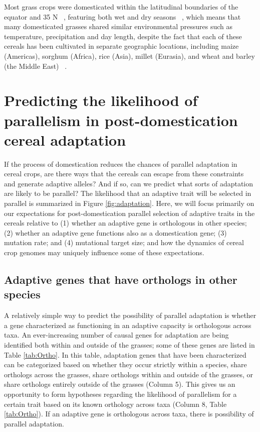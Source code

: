 \documentclass[12pt]{article}
\begin{document}
Most grass crops were domesticated within the latitudinal boundaries of the equator and 35 N ~\citep{Jain1993, Gepts2010}, featuring both wet and dry seasons ~\citep{Jain1993}, which means that many domesticated grasses shared similar environmental pressures such as temperature, precipitation and day length, despite the fact that each of these cereals has been cultivated in separate geographic locations, including maize (Americas), sorghum (Africa), rice (Asia), millet (Eurasia), and wheat and barley (the Middle East) ~\citep{Glmin2009}.


\paragraph{}

\section*{Predicting the likelihood of parallelism in post-domestication cereal adaptation}
If the process of domestication reduces the chances of parallel adaptation in cereal crops, are there ways that the cereals can escape from these constraints and generate adaptive alleles? And if so, can we predict what sorts of  adaptation are likely to be parallel? The likelihood that an adaptive trait will be selected in parallel is summarized in Figure \ref{fig:adaptation}. Here, we will focus primarily on our expectations for post-domestication parallel selection of adaptive traits in the cereals relative to (1) whether an adaptive gene is orthologous in other species; (2) whether an adaptive gene functions also as a domestication gene; (3) mutation rate; and (4) mutational target size; and how the dynamics of cereal crop genomes may uniquely influence some of these expectations. 

\subsection*{Adaptive genes that have orthologs in other species}
A relatively simple way to predict the possibility of parallel adaptation is whether a gene characterized as functioning in an adaptive capacity is orthologous across taxa. 
An ever-increasing number of causal genes for adaptation are being identified both within and outside of the grasses; some of these genes are listed in Table \ref{tab:Ortho}.
In this table, adaptation genes that have been characterized can be categorized based on whether they occur strictly within a species, share orthologs across the grasses, share orthologs within and outside of the grasses, or share orthologs entirely outside of the grasses (Column 5).
This gives us an opportunity to form hypotheses regarding the likelihood of parallelism for a certain trait based on its known orthology across taxa (Column 8, Table \ref{tab:Ortho}). If an adaptive gene is orthologous across taxa, there is possibility of parallel adaptation. 
\end{document}
